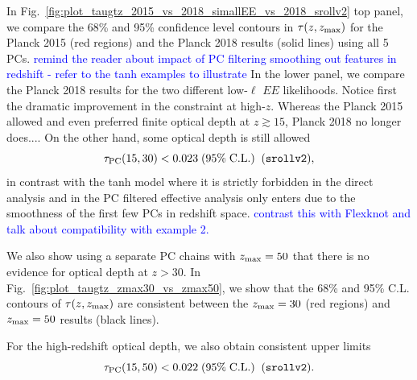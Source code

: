 \documentclass[prd,twocolumn,amsmath,amssymb,floatfix,superscriptaddress,nofootinbib]{revtex4-1}
\newcommand{\zmax}{z_{\rm max}}
\newcommand{\beq}{\begin{equation}}
\newcommand{\eeq}{\end{equation}}
\newcommand{\wh}[1]{\textcolor{blue}{#1}}
\begin{document}
{In Fig.~\ref{fig:plot_taugtz_2015_vs_2018_simallEE_vs_2018_srollv2} top panel, we compare the 68\% and 95\% confidence level contours in $\tau(z, \zmax)$ for the Planck 2015 (red regions) and the Planck 2018 results (solid lines) using all 5 PCs.
\wh{remind the reader about impact of PC filtering smoothing out features in redshift - refer to the tanh examples to illustrate}
In the lower panel, we compare the Planck 2018 results for the two different low-$\ell$ $EE$ likelihoods.   Notice first the dramatic improvement in the
constraint at high-$z$.  Whereas the Planck 2015 allowed and even preferred
finite optical depth at $z\gtrsim 15$, Planck 2018 no longer does....
On the other hand, some optical depth is still allowed 
\beq
\tau_{\rm PC}(15, 30) < 0.023 \; (95\%\; \mathrm{C.L.})\;\;(\texttt{srollv2}),
\eeq
in contrast with the tanh model where it is strictly forbidden in the direct analysis and in the PC filtered effective analysis only enters due to the smoothness of the first few PCs in redshift space.
\wh{contrast this with Flexknot and talk about compatibility with example 2.}

We also show using a separate PC chains with $\zmax = 50$ that there is no evidence for optical depth at $z>30$. 
In Fig.~\ref{fig:plot_taugtz_zmax30_vs_zmax50}, we show that the 68\% and 95\% C.L. contours of $\tau(z, \zmax)$ are consistent between the $\zmax = 30$ (red regions) and $\zmax = 50$ results (black lines).

%
%

For the high-redshift optical depth, we also obtain consistent upper limits
\beq
\tau_{\rm PC}(15, 50) < 0.022 \; (95\%\; \mathrm{C.L.})\;\;(\texttt{srollv2}).
\eeq

}
\end{document}
